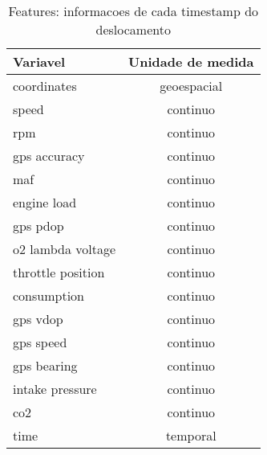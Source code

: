 \documentclass[10pt, conference]{IEEEtran}
\begin{document}
\begin{itemize}
\begin{table}
\caption{Features: informacoes de cada timestamp do deslocamento}
\label{tab:perfs}
\centering
\begin{tabular}{l|c}
\multicolumn{1}{l|}{\bf Variavel} &
\multicolumn{1}{l}{\bf Unidade de medida}  \\ \hline
coordinates        & geoespacial       \\
speed              & continuo         \\
rpm                & continuo       \\
gps accuracy       & continuo       \\
maf                & continuo         \\
engine load        & continuo       \\
gps pdop           & continuo       \\
o2 lambda voltage  & continuo       \\
throttle position  & continuo       \\
consumption        & continuo       \\
gps vdop           & continuo       \\
gps speed          & continuo       \\
gps bearing        & continuo       \\
intake pressure    & continuo       \\
co2                & continuo       \\
time               & temporal       \\

\end{tabular}
\end{table}









\end{itemize}
\end{document}
